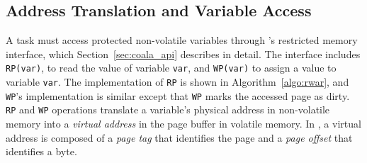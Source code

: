 \subsection{Address Translation and Variable Access}

A \sys task must access protected non-volatile variables through \sys's
restricted memory interface, which Section~\ref{sec:coala_api} describes in
detail.  The interface includes \texttt{RP(var)}, to read the value of variable
{\tt var}, and \texttt{WP(var)} to assign a value to variable {\tt var}. The
implementation of {\tt RP} is shown in Algorithm~\ref{algo:rwar}, and {\tt
WP}'s implementation is similar except that {\tt WP} marks the accessed page as
dirty.
%
{\tt RP} and {\tt WP} operations translate a variable's physical address in
non-volatile memory into a \emph{virtual address} in the page buffer in
volatile memory. In \sys, a virtual address is composed of a \emph{page tag}
that identifies the page and a \emph{page offset} that identifies a byte.


\begin{figure} %
\end{figure}

